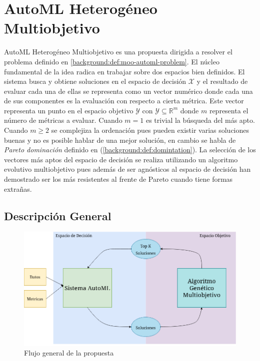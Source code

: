 
\chapter{AutoML Heterog\'eneo Multiobjetivo}\label{chapter:proposal}

AutoML Heterog\'eneo Multiobjetivo es una propuesta dirigida a resolver el problema definido en \ref{background:def:moo-automl-problem}. El n\'ucleo fundamental de la idea radica en trabajar sobre dos espacios bien definidos. El sistema busca y obtiene soluciones en el espacio de decisi\'on $\mathcal{X}$ y el resultado  de evaluar cada una de ellas se representa como un vector num\'erico donde cada una de sus componentes es la evaluaci\'on con respecto a cierta m\'etrica. Este vector representa un punto en el espacio objetivo $\mathcal{Y}$ con $\mathcal{Y} \subseteq \mathbb{R}^m$ donde $m$ representa el n\'umero de m\'etricas a evaluar. Cuando $m = 1$ es trivial la b\'usqueda del m\'as apto. Cuando $m \ge 2$ se complejiza la ordenaci\'on pues pueden existir varias soluciones buenas y no es posible hablar de una mejor soluci\'on, en cambio se habla de \textit{Pareto dominaci\'on} definido en (\ref{background:def:domintation}). La selecci\'on de los vectores  m\'as aptos del espacio de decisi\'on se realiza utilizando un algoritmo evolutivo multiobjetivo pues adem\'as de ser agn\'osticos al espacio de decisi\'on han demostrado ser los m\'as resistentes al frente de Pareto cuando tiene formas extra\~nas.

\section{Descripci\'on General}
\begin{figure}[ht]
    \centering
    \includegraphics[scale=0.4]{Pictures/automl_moo_proposal2.png}
    \caption{Flujo general de la propuesta}
    \label{proposal:fig:flux}
\end{figure}

